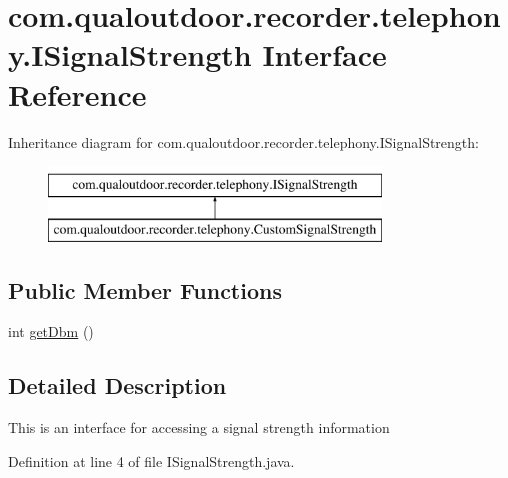 \hypertarget{interfacecom_1_1qualoutdoor_1_1recorder_1_1telephony_1_1ISignalStrength}{\section{com.\-qualoutdoor.\-recorder.\-telephony.\-I\-Signal\-Strength Interface Reference}
\label{interfacecom_1_1qualoutdoor_1_1recorder_1_1telephony_1_1ISignalStrength}
}
Inheritance diagram for com.\-qualoutdoor.\-recorder.\-telephony.\-I\-Signal\-Strength\-:\begin{figure}[H]
\begin{center}
\leavevmode
\includegraphics[height=2.000000cm]{interfacecom_1_1qualoutdoor_1_1recorder_1_1telephony_1_1ISignalStrength}
\end{center}
\end{figure}
\subsection*{Public Member Functions}
\begin{DoxyCompactItemize}
\item 
int \hyperlink{interfacecom_1_1qualoutdoor_1_1recorder_1_1telephony_1_1ISignalStrength_a7afc6c43cd03481de1a10ab7c2770fa1}{get\-Dbm} ()
\end{DoxyCompactItemize}


\subsection{Detailed Description}
This is an interface for accessing a signal strength information 

Definition at line 4 of file I\-Signal\-Strength.\-java.




